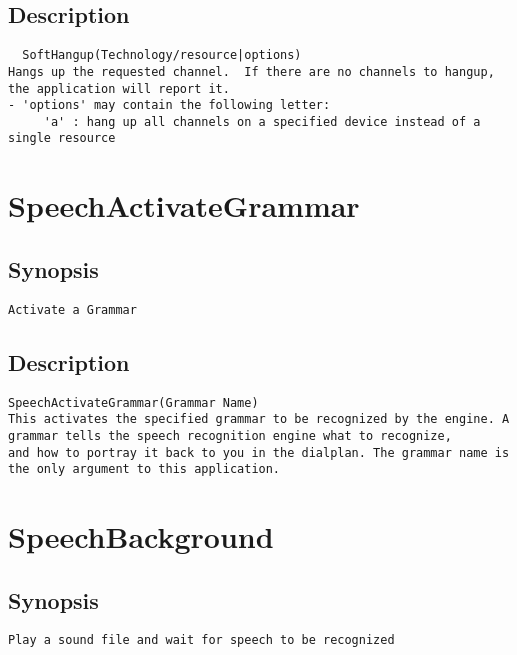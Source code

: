 \subsection{Description}
\begin{verbatim}
  SoftHangup(Technology/resource|options)
Hangs up the requested channel.  If there are no channels to hangup,
the application will report it.
- 'options' may contain the following letter:
     'a' : hang up all channels on a specified device instead of a single resource

\end{verbatim}


\section{SpeechActivateGrammar}
\subsection{Synopsis}
\begin{verbatim}
Activate a Grammar
\end{verbatim}
\subsection{Description}
\begin{verbatim}
SpeechActivateGrammar(Grammar Name)
This activates the specified grammar to be recognized by the engine. A grammar tells the speech recognition engine what to recognize, 
and how to portray it back to you in the dialplan. The grammar name is the only argument to this application.

\end{verbatim}


\section{SpeechBackground}
\subsection{Synopsis}
\begin{verbatim}
Play a sound file and wait for speech to be recognized
\end{verbatim}

